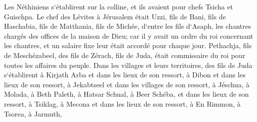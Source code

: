 \verse Les Néthiniens s`établirent sur la colline, et ils avaient pour chefs Tsicha et Guischpa. 
\verse Le chef des Lévites à Jérusalem était Uzzi, fils de Bani, fils de Haschabia, fils de Matthania, fils de Michée, d`entre les fils d`Asaph, les chantres chargés des offices de la maison de Dieu; 
\verse car il y avait un ordre du roi concernant les chantres, et un salaire fixe leur était accordé pour chaque jour. 
\verse Pethachja, fils de Meschézabeel, des fils de Zérach, fils de Juda, était commissaire du roi pour toutes les affaires du peuple. 
\verse Dans les villages et leurs territoires, des fils de Juda s`établirent à Kirjath Arba et dans les lieux de son ressort, à Dibon et dans les lieux de son ressort, à Jekabtseel et dans les villages de son ressort, 
\verse à Jéschua, à Molada, à Beth Paleth, 
\verse à Hatsar Schual, à Beer Schéba, et dans les lieux de son ressort, 
\verse à Tsiklag, à Mecona et dans les lieux de son ressort, 
\verse à En Rimmon, à Tsorea, à Jarmuth, 
